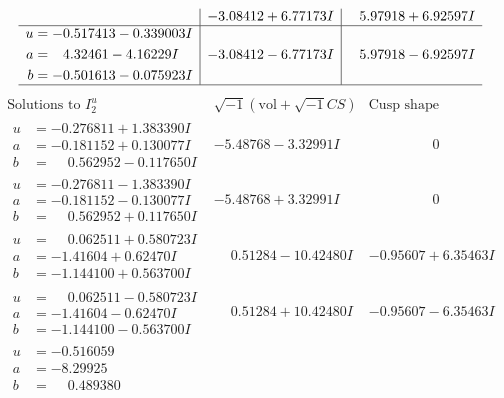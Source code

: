 \documentclass[1p]{elsarticle_modified}
\theoremstyle{definition}
\newcommand{\I}{\sqrt{-1}}
\begin{document}
$$\begin{array}{c|c|c}
 & -3.08412 + 6.77173 I & \phantom{-}5.97918 + 6.92597 I \\ \hline\begin{aligned}
u &= -0.517413 - 0.339003 I \\
a &= \phantom{-}4.32461 - 4.16229 I \\
b &= -0.501613 - 0.075923 I\end{aligned}
 & -3.08412 - 6.77173 I & \phantom{-}5.97918 - 6.92597 I\\
 \hline 
 \end{array}$$\newpage$$\begin{array}{c|c|c}  
\text{Solutions to }I^u_{2}& \I (\text{vol} + \sqrt{-1}CS) & \text{Cusp shape}\\
 \hline 
\begin{aligned}
u &= -0.276811 + 1.383390 I \\
a &= -0.181152 + 0.130077 I \\
b &= \phantom{-}0.562952 - 0.117650 I\end{aligned}
 & -5.48768 - 3.32991 I & \phantom{-0.000000 } 0 \\ \hline\begin{aligned}
u &= -0.276811 - 1.383390 I \\
a &= -0.181152 - 0.130077 I \\
b &= \phantom{-}0.562952 + 0.117650 I\end{aligned}
 & -5.48768 + 3.32991 I & \phantom{-0.000000 } 0 \\ \hline\begin{aligned}
u &= \phantom{-}0.062511 + 0.580723 I \\
a &= -1.41604 + 0.62470 I \\
b &= -1.144100 + 0.563700 I\end{aligned}
 & \phantom{-}0.51284 - 10.42480 I & -0.95607 + 6.35463 I \\ \hline\begin{aligned}
u &= \phantom{-}0.062511 - 0.580723 I \\
a &= -1.41604 - 0.62470 I \\
b &= -1.144100 - 0.563700 I\end{aligned}
 & \phantom{-}0.51284 + 10.42480 I & -0.95607 - 6.35463 I \\ \hline\begin{aligned}
u &= -0.516059\phantom{ +0.000000I} \\
a &= -8.29925\phantom{ +0.000000I} \\
b &= \phantom{-}0.489380\phantom{ +0.000000I}\end{aligned}

\end{array}$$
\end{document}
